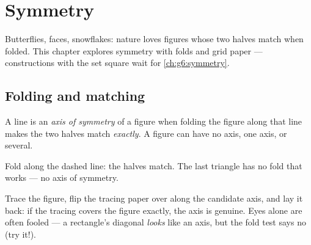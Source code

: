\chapter{Symmetry}\label{ch:g4:symmetry}

Butterflies, faces, snowflakes: nature loves figures whose two halves
match when folded. This chapter explores symmetry with folds and grid
paper --- constructions with the set square wait for
\cref{ch:g6:symmetry}.

\section{Folding and matching}

\begin{definition}\label{def:g4:symmetry:def}
A line is an \emph{axis of symmetry} of a
figure when folding the figure along that line makes the two halves
match \emph{exactly}. A figure can have no axis, one axis, or
several.
\end{definition}

\begin{omfigure}

{\small Fold along the dashed line: the halves match. The last
triangle has no fold that works --- no axis of symmetry.}
\end{omfigure}

\begin{example}\label{ex:g4:symmetry:trace}
Trace the figure, flip the tracing paper over along the candidate
axis, and lay it back: if the tracing covers the figure exactly, the
axis is genuine. Eyes alone are often fooled --- a rectangle's
diagonal \emph{looks} like an axis, but the fold test says no (try
it!).
\end{example}

